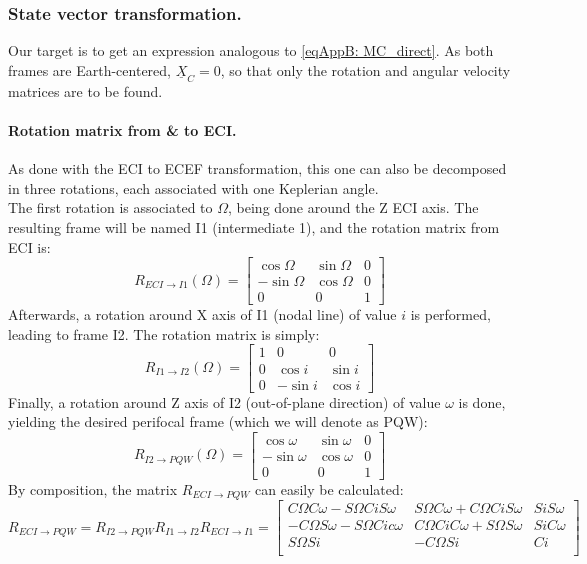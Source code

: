 		\subsubsection{State vector transformation.}
		\indent Our target is to get an expression analogous to \eqref{eqAppB: 	MC_direct}. As both frames are Earth-centered, $\underline{X}_C = 0$, so that only the rotation and angular velocity matrices are to be found.
			\paragraph{Rotation matrix from \& to ECI. \\}
			\indent As done with the ECI to ECEF transformation, this one can also be decomposed in three rotations, each associated with one Keplerian angle.\\
			\indent The first rotation is associated to $\Omega$, being done around the Z ECI axis. The resulting frame will be named I1 (intermediate 1), and the rotation matrix from ECI is:
			\[
			R_{ECI\rightarrow I1}(\Omega) = \left[
			\begin{array}{lll}
			\cos \Omega 	& \sin \Omega 	& 0 \\
			- \sin \Omega 	& \cos \Omega 	& 0 \\
			0 				& 0 			& 1 
			\end{array}						
			\right]	
			\]
			\indent Afterwards, a rotation around X axis of I1 (nodal line) of value $i$ is performed, leading to frame I2. The rotation matrix is simply:
			\[
			R_{I1\rightarrow I2}(\Omega) = \left[
			\begin{array}{lll}
			1 	& 0			 	& 0 \\
			0 	& \cos i 		& \sin i \\
			0 	& -\sin i		& \cos i 
			\end{array}						
			\right]	
			\]
			\indent Finally, a rotation around Z axis of I2 (out-of-plane direction) of value $\omega$ is done, yielding the desired perifocal frame (which we will denote as PQW):
			\[
			R_{I2\rightarrow PQW}(\Omega) = \left[
			\begin{array}{lll}
			\cos \omega 	& \sin \omega 	& 0 \\
			- \sin \omega 	& \cos \omega 	& 0 \\
			0 				& 0 			& 1 
			\end{array}						
			\right]	
			\]
			\indent By composition, the matrix $R_{ECI\rightarrow PQW}$ can easily be calculated:
			\[
			R_{ECI \rightarrow PQW} = R_{I2 \rightarrow PQW}R_{I1 \rightarrow I2} R_{ECI \rightarrow I1} = 
			\left[\begin{array}{lll}
			C \Omega C \omega - S \Omega Ci S\omega 	& S\Omega C\omega + C\Omega Ci S\omega 	& Si S\omega \\
			-C \Omega S \omega - S \Omega Ci c\omega 	& C\Omega Ci C\omega + S\Omega S\omega 	& Si C\omega \\
			S \Omega Si									& - C\Omega Si  						& Ci \\
			\end{array}\right]
			\]
